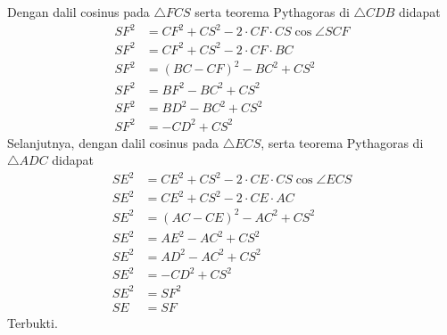 Dengan dalil cosinus pada $\triangle FCS$ serta teorema Pythagoras di $\triangle CDB$ didapat
\begin{align*}
    SF^2 &= CF^2 + CS^2 - 2\cdot CF \cdot CS \cos \angle SCF\\
    SF^2 &= CF^2 + CS^2 - 2\cdot CF \cdot BC\\
    SF^2 &= (BC-CF)^2 - BC^2 + CS^2\\
    SF^2 &= BF^2 - BC^2 + CS^2\\
    SF^2 &= BD^2 - BC^2 + CS^2\\
    SF^2 &= -CD^2 + CS^2
\end{align*}
Selanjutnya, dengan dalil cosinus pada $\triangle ECS$, serta teorema Pythagoras di $\triangle ADC$ didapat
\begin{align*}
    SE^2 &= CE^2 + CS^2 - 2\cdot CE \cdot CS \cos \angle ECS \\
    SE^2 &= CE^2 + CS^2 - 2\cdot CE \cdot AC\\
    SE^2 &= (AC-CE)^2 - AC^2 + CS^2\\
    SE^2 &= AE^2 - AC^2 + CS^2\\
    SE^2 &= AD^2 - AC^2 + CS^2\\
    SE^2 &= -CD^2 + CS^2\\
    SE^2 &= SF^2\\
    SE &= SF
\end{align*}
Terbukti.

\newpage
